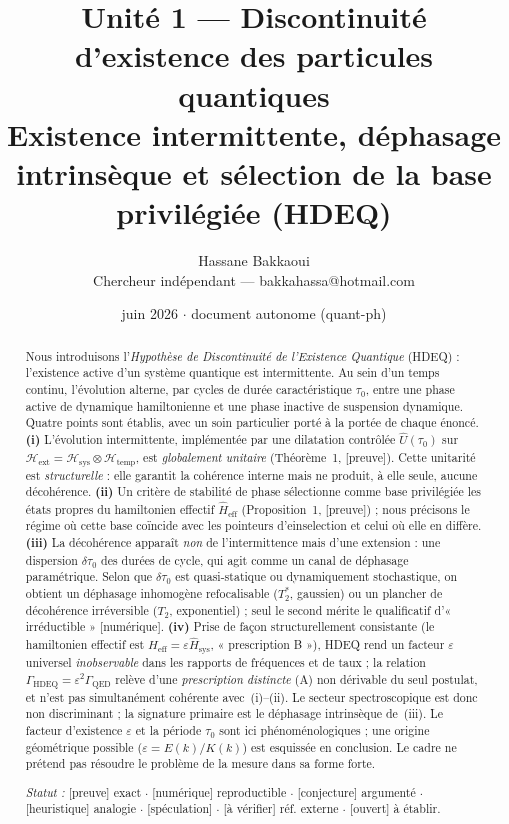 \documentclass[11pt,a4paper]{article}
\title{\textbf{Unit\'e 1 --- Discontinuit\'e d'existence des particules quantiques}\\[2pt]
\large Existence intermittente, d\'ephasage intrins\`eque et s\'election de la base privil\'egi\'ee (HDEQ)}
\author{Hassane Bakkaoui\\ \small Chercheur ind\'ependant --- bakkahassa@hotmail.com}
\date{\small juin 2026 $\cdot$ document autonome (quant-ph)}
\newcommand{\Hext}{\mathcal{H}_{\mathrm{ext}}}
\newcommand{\Hsys}{\mathcal{H}_{\mathrm{sys}}}
\newcommand{\Htemp}{\mathcal{H}_{\mathrm{temp}}}
\newcommand{\Hsysop}{\hat{H}_{\mathrm{sys}}}
\newcommand{\Heff}{\hat{H}_{\mathrm{eff}}}
\newcommand{\statut}[1]{{\footnotesize\textsf{[#1]}}}
\theoremstyle{plain}
\theoremstyle{definition}
\theoremstyle{remark}
\begin{document}
\maketitle

\begin{abstract}
\noindent
Nous introduisons l'\emph{Hypoth\`ese de Discontinuit\'e de l'Existence Quantique}
(HDEQ) : l'existence active d'un syst\`eme quantique est intermittente. Au sein
d'un temps continu, l'\'evolution alterne, par cycles de dur\'ee caract\'eristique
$\tau_0$, entre une phase active de dynamique hamiltonienne et une phase
inactive de suspension dynamique. Quatre points sont \'etablis, avec un soin
particulier port\'e \`a la port\'ee de chaque \'enonc\'e.
\textbf{(i)} L'\'evolution intermittente, impl\'ement\'ee par une dilatation contr\^ol\'ee
$\hat{U}(\tau_0)$ sur $\Hext=\Hsys\otimes\Htemp$, est \emph{globalement unitaire}
(Th\'eor\`eme~1, \statut{preuve}). Cette unitarit\'e est \emph{structurelle} : elle
garantit la coh\'erence interne mais ne produit, \`a elle seule, aucune d\'ecoh\'erence.
\textbf{(ii)} Un crit\`ere de stabilit\'e de phase s\'electionne comme base privil\'egi\'ee
les \'etats propres du hamiltonien effectif $\Heff$ (Proposition~1, \statut{preuve}) ;
nous pr\'ecisons le r\'egime o\`u cette base co\"incide avec les pointeurs d'einselection
et celui o\`u elle en diff\`ere.
\textbf{(iii)} La d\'ecoh\'erence appara\^it \emph{non} de l'intermittence mais d'une
extension : une dispersion $\delta\tau_0$ des dur\'ees de cycle, qui agit comme un
canal de d\'ephasage param\'etrique. Selon que $\delta\tau_0$ est quasi-statique ou
dynamiquement stochastique, on obtient un d\'ephasage inhomog\`ene refocalisable
($T_2^\ast$, gaussien) ou un plancher de d\'ecoh\'erence irr\'eversible ($T_2$, exponentiel) ;
seul le second m\'erite le qualificatif d'« irr\'eductible » \statut{num\'erique}.
\textbf{(iv)} Prise de fa\c{c}on structurellement consistante (le hamiltonien effectif
est $\Heff=\varepsilon\Hsysop$, « prescription B »), HDEQ rend un facteur $\varepsilon$
universel \emph{inobservable} dans les rapports de fr\'equences et de taux ; la
relation $\Gamma_{\mathrm{HDEQ}}=\varepsilon^2\Gamma_{\mathrm{QED}}$ rel\`eve d'une
\emph{prescription distincte} (A) non d\'erivable du seul postulat, et n'est pas
simultan\'ement coh\'erente avec~(i)--(ii). Le secteur spectroscopique est donc
non discriminant ; la signature primaire est le d\'ephasage intrins\`eque de~(iii).
Le facteur d'existence $\varepsilon$ et la p\'eriode $\tau_0$ sont ici ph\'enom\'enologiques ;
une origine g\'eom\'etrique possible ($\varepsilon=E(k)/K(k)$) est esquiss\'ee en conclusion.
Le cadre ne pr\'etend pas r\'esoudre le probl\`eme de la mesure dans sa forme forte.
\par\smallskip
\noindent\textit{Statut :} \statut{preuve} exact $\cdot$ \statut{num\'erique} reproductible $\cdot$
\statut{conjecture} argument\'e $\cdot$ \statut{heuristique} analogie $\cdot$
\statut{sp\'eculation} $\cdot$ \statut{\`a v\'erifier} r\'ef. externe $\cdot$
\statut{ouvert} \`a \'etablir.
\end{abstract}
\end{document}
